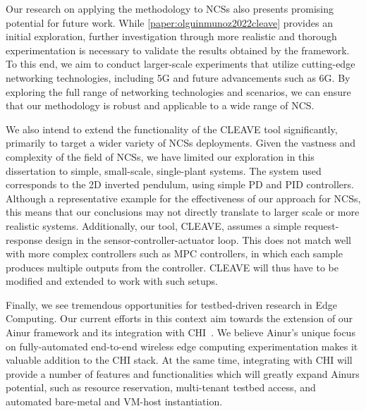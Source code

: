 Our research on applying the methodology to \glspl{NCS} also presents promising potential for future work.
While \cref{paper:olguinmunoz2022cleave} provides an initial exploration, further investigation through more realistic and thorough experimentation is necessary to validate the results obtained by the framework.
To this end, we aim to conduct larger-scale experiments that utilize cutting-edge networking technologies, including 5G and future advancements such as 6G.
By exploring the full range of networking technologies and scenarios, we can ensure that our methodology is robust and applicable to a wide range of \gls{NCS}.

We also intend to extend the functionality of the \gls{CLEAVE} tool significantly, primarily to target a wider variety of \glspl{NCS} deployments.
Given the vastness and complexity of the field of \glspl{NCS}, we have limited our exploration in this dissertation to simple, small-scale, single-plant systems.
The system used corresponds to the \gls{2D} inverted pendulum, using simple \gls{PD} and \gls{PID} controllers.
Although a representative example for the effectiveness of our approach for \glspl{NCS}, this means that our conclusions may not directly translate to larger scale or more realistic systems.
Additionally, our tool, \gls{CLEAVE}, assumes a simple request-response design in the sensor-controller-actuator loop.
This does not match well with more complex controllers such as \gls{MPC} controllers, in which each sample produces multiple outputs from the controller.
\gls{CLEAVE} will thus have to be modified and extended to work with such setups.

Finally, we see tremendous opportunities for testbed-driven research in Edge Computing.
Our current efforts in this context aim towards the extension of our Ainur framework and its integration with \gls{CHI}~\cite{keahey2020lessons}.
We believe Ainur's unique focus on fully-automated end-to-end wireless edge computing experimentation makes it valuable addition to the \gls{CHI} stack.
At the same time, integrating with \gls{CHI} will provide a number of features and functionalities which will greatly expand Ainurs potential, such as resource reservation, multi-tenant testbed access, and automated bare-metal and \gls{VM}-host instantiation.

